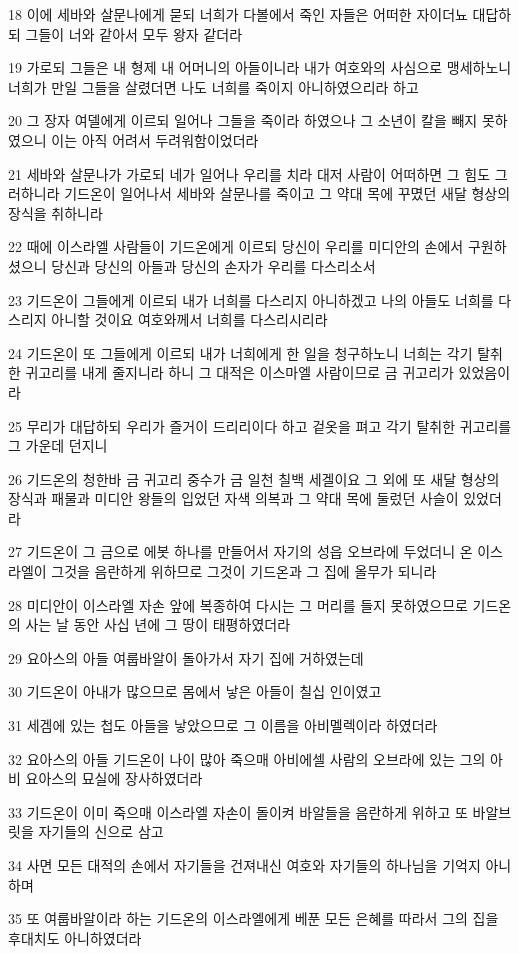 \par 18 이에 세바와 살문나에게 묻되 너희가 다볼에서 죽인 자들은 어떠한 자이더뇨 대답하되 그들이 너와 같아서 모두 왕자 같더라
\par 19 가로되 그들은 내 형제 내 어머니의 아들이니라 내가 여호와의 사심으로 맹세하노니 너희가 만일 그들을 살렸더면 나도 너희를 죽이지 아니하였으리라 하고
\par 20 그 장자 여델에게 이르되 일어나 그들을 죽이라 하였으나 그 소년이 칼을 빼지 못하였으니 이는 아직 어려서 두려워함이었더라
\par 21 세바와 살문나가 가로되 네가 일어나 우리를 치라 대저 사람이 어떠하면 그 힘도 그러하니라 기드온이 일어나서 세바와 살문나를 죽이고 그 약대 목에 꾸몄던 새달 형상의 장식을 취하니라
\par 22 때에 이스라엘 사람들이 기드온에게 이르되 당신이 우리를 미디안의 손에서 구원하셨으니 당신과 당신의 아들과 당신의 손자가 우리를 다스리소서
\par 23 기드온이 그들에게 이르되 내가 너희를 다스리지 아니하겠고 나의 아들도 너희를 다스리지 아니할 것이요 여호와께서 너희를 다스리시리라
\par 24 기드온이 또 그들에게 이르되 내가 너희에게 한 일을 청구하노니 너희는 각기 탈취한 귀고리를 내게 줄지니라 하니 그 대적은 이스마엘 사람이므로 금 귀고리가 있었음이라
\par 25 무리가 대답하되 우리가 즐거이 드리리이다 하고 겉옷을 펴고 각기 탈취한 귀고리를 그 가운데 던지니
\par 26 기드온의 청한바 금 귀고리 중수가 금 일천 칠백 세겔이요 그 외에 또 새달 형상의 장식과 패물과 미디안 왕들의 입었던 자색 의복과 그 약대 목에 둘렀던 사슬이 있었더라
\par 27 기드온이 그 금으로 에봇 하나를 만들어서 자기의 성읍 오브라에 두었더니 온 이스라엘이 그것을 음란하게 위하므로 그것이 기드온과 그 집에 올무가 되니라
\par 28 미디안이 이스라엘 자손 앞에 복종하여 다시는 그 머리를 들지 못하였으므로 기드온의 사는 날 동안 사십 년에 그 땅이 태평하였더라
\par 29 요아스의 아들 여룹바알이 돌아가서 자기 집에 거하였는데
\par 30 기드온이 아내가 많으므로 몸에서 낳은 아들이 칠십 인이였고
\par 31 세겜에 있는 첩도 아들을 낳았으므로 그 이름을 아비멜렉이라 하였더라
\par 32 요아스의 아들 기드온이 나이 많아 죽으매 아비에셀 사람의 오브라에 있는 그의 아비 요아스의 묘실에 장사하였더라
\par 33 기드온이 이미 죽으매 이스라엘 자손이 돌이켜 바알들을 음란하게 위하고 또 바알브릿을 자기들의 신으로 삼고
\par 34 사면 모든 대적의 손에서 자기들을 건져내신 여호와 자기들의 하나님을 기억지 아니하며
\par 35 또 여룹바알이라 하는 기드온의 이스라엘에게 베푼 모든 은혜를 따라서 그의 집을 후대치도 아니하였더라

